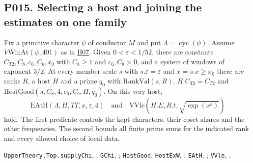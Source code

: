 \subsection{P015. Selecting a host and joining the estimates on one family}
\label{r23:host}

\begin{proposition}
Fix a primitive character $\psi$ of conductor $M$ and put $\Lambda=\operatorname{cyc}(\psi)$.
Assume $V\mathrm{WinAt}(\psi,401)$ as in \hyperref[sub:B07]{B07}.
Given $0<\varepsilon<1/52$, there are constants $C_{T2},C_8,c_6,C_b,x_0$
with $C_8\ge1$ and $c_6,C_b>0$, and a system of windows of exponent
$3/2$. At every member scale $s$ with $s.\varepsilon=\varepsilon$ and
$x=s.x\ge x_0$ there are ranks $R$, a host $H$ and a prime $q_0$ with
$\mathrm{RankVal}(s,R)$, $H.C_{T2}=C_{T2}$ and
$\mathrm{HostGood}(s,C_8,4,c_6,C_b,H,q_0)$. On this very host,
\[
  \mathrm{EAtH}(\Lambda,H,TT,x,\varepsilon,4)
  \quad\text{and}\quad
  \mathrm{VVle}(H.E,R.t,\sqrt{\exp(x^\varepsilon)})
\]
hold. The first predicate controls the kept characters, their coset shares
and the other frequencies. The second bounds all finite prime sums for
the indicated rank and every allowed choice of local data.
\end{proposition}
\noindent\nolinkurl{UpperTheory.Top.supplyChi}, ;
\nolinkurl{GChi}, ;
\nolinkurl{HostGood}, \nolinkurl{HostExW},
;
\nolinkurl{EAtH}, ;
\nolinkurl{VVle}, .

